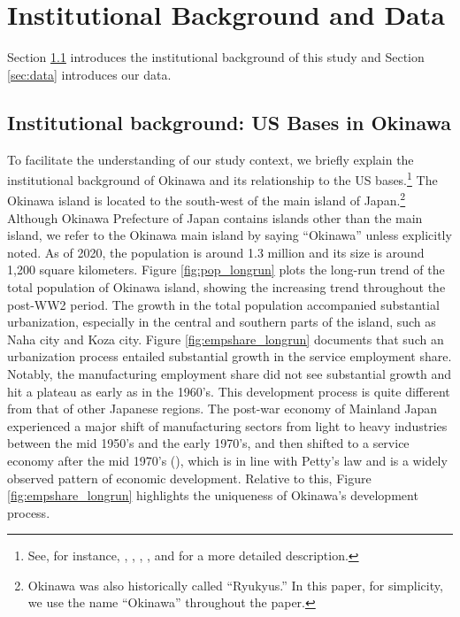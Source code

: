 \documentclass[12pt, unicode, a4paper]{article}
\newcommand{\1}{\mbox{1}\hspace{-0.25em}\mbox{l}} %
\begin{document}


\section{Institutional Background and Data}\label{sec:inst_data}

Section \ref{sec:instutitional} introduces the institutional background of this study and Section \ref{sec:data} introduces our data.

\subsection{Institutional background: US Bases in Okinawa}\label{sec:instutitional}

To facilitate the understanding of our study context, we briefly explain the institutional background of Okinawa and its relationship to the US bases.\footnote{
See, for instance, \cite{okinawa2000}, \cite{taira2012}, \cite{toriyama2013},  \cite{franks2023}, and \cite{oshiro23} for a more detailed description.
}
The Okinawa island is located to the south-west of the main island of Japan.\footnote{
Okinawa was also historically called ``Ryukyus.''  In this paper, for simplicity, we use the name ``Okinawa'' throughout the paper. 
} 
Although Okinawa Prefecture of Japan contains islands other than the main island, we refer to the Okinawa main island by saying ``Okinawa'' unless explicitly noted. 
As of 2020, the population is around 1.3 million and its size is around 1,200 square kilometers.
Figure \ref{fig:pop_longrun} plots the long-run trend of the total population of Okinawa island, showing the increasing trend throughout the post-WW2 period.
The growth in the total population accompanied substantial urbanization, especially in the central and southern parts of the island, such as Naha city and Koza city. 
Figure \ref{fig:empshare_longrun} documents that such an urbanization process entailed substantial growth in the service employment share. Notably, the manufacturing employment share did not see substantial growth and hit a plateau as early as in the 1960's. 
This development process is quite different from that of other Japanese regions. The post-war economy of Mainland Japan experienced a major shift of manufacturing sectors from light to heavy industries between the mid 1950's and the early 1970's, and then shifted to a service economy after the mid 1970's (\citealt{fujita1997regional}), which is in line with Petty's law and is a widely observed pattern of economic development. Relative to this, Figure \ref{fig:empshare_longrun} highlights the uniqueness of Okinawa's development process.
 
\end{document}
